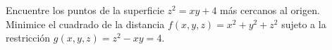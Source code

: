 Encuentre los puntos de la superficie $z^2 = xy + 4$ más cercanos al origen. Minimice el cuadrado de la distancia $f(x, y, z) = x^2 + y^2 + z^2$ sujeto a la restricción $g(x, y, z) = z^2 - xy = 4$.
